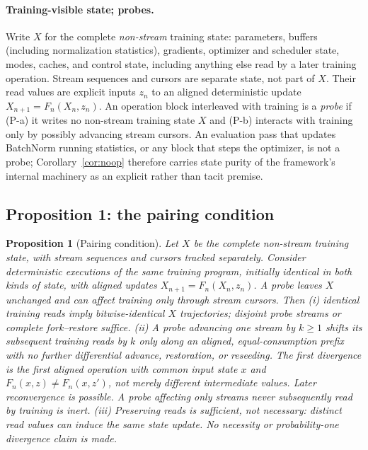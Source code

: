 \documentclass[10pt,letterpaper]{article}
\newtheorem{proposition}{Proposition}
\theoremstyle{remark}
\begin{document}
\paragraph{Training-visible state; probes.}
Write $X$ for the complete \emph{non-stream} training state: parameters,
buffers (including normalization statistics), gradients, optimizer and
scheduler state, modes, caches, and control state, including anything else
read by a later training operation. Stream sequences and cursors are separate
state, not part of $X$. Their read values are explicit inputs $z_n$ to an
aligned deterministic update $X_{n+1}=F_n(X_n,z_n)$. An
operation block interleaved with training is a \emph{probe} if (P-a) it
writes no non-stream training state $X$ and (P-b) interacts with training only
by possibly advancing stream cursors. An evaluation pass that updates
BatchNorm running statistics, or any block that steps the optimizer, is
not a probe; Corollary~\ref{cor:noop} therefore carries state purity of
the framework's internal machinery as an explicit rather than tacit
premise.

\subsection{Proposition 1: the pairing condition}

\begin{proposition}[Pairing condition]
\label{prop:pairing}
Let $X$ be the complete non-stream training state, with stream sequences
and cursors tracked separately. Consider deterministic executions of the
same training program, initially identical in both kinds of state, with
aligned updates $X_{n+1}=F_n(X_n,z_n)$. A probe leaves $X$ unchanged and can
affect training only through stream cursors. Then (i) identical training
reads imply bitwise-identical $X$ trajectories; disjoint probe streams or
complete fork--restore suffice. (ii) A probe advancing one stream by
$k\ge1$ shifts its subsequent training reads by $k$ only along an aligned,
equal-consumption prefix with no further differential advance, restoration,
or reseeding.
The first divergence is the first aligned operation with common input
state $x$ and $F_n(x,z)\ne F_n(x,z')$, not merely different intermediate
values. Later reconvergence is possible. A probe affecting only streams
never subsequently read by training is inert. (iii) Preserving reads is
sufficient, not necessary: distinct read values can induce the same state
update. No necessity or probability-one divergence claim is made.
\end{proposition}
\end{document}
